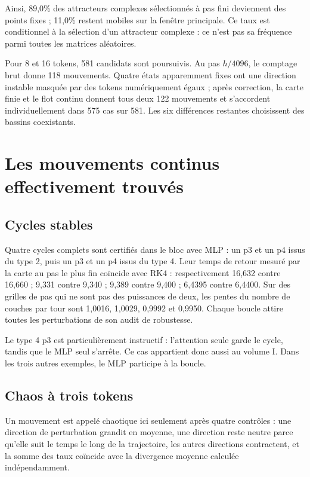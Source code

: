\documentclass[11pt,a4paper]{article}
\theoremstyle{definition}
\begin{document}
Ainsi, 89,0\% des attracteurs complexes sélectionnés à pas fini deviennent des points
fixes ; 11,0\% restent mobiles sur la fenêtre principale. Ce taux est conditionnel à
la sélection d'un attracteur complexe : ce n'est pas sa fréquence parmi toutes les
matrices aléatoires.

Pour 8 et 16 tokens, 581 candidats sont poursuivis. Au pas $h/4096$, le comptage brut
donne 118 mouvements. Quatre états apparemment fixes ont une direction instable masquée
par des tokens numériquement égaux ; après correction, la carte finie et le flot
continu donnent tous deux 122 mouvements et s'accordent individuellement dans
575 cas sur 581. Les six différences restantes choisissent des bassins coexistants.

\section{Les mouvements continus effectivement trouvés}
\label{sec:attractors}

\subsection{Cycles stables}

Quatre cycles complets sont certifiés dans le bloc avec MLP : un p3 et un p4 issus du
type 2, puis un p3 et un p4 issus du type 4. Leur temps de retour mesuré par la carte au
pas le plus fin coïncide avec RK4 : respectivement 16,632 contre 16,660 ; 9,331 contre
9,340 ; 9,389 contre 9,400 ; 6,4395 contre 6,4400. Sur des grilles de pas qui ne sont
pas des puissances de deux, les pentes du nombre de couches par tour sont 1,0016,
1,0029, 0,9992 et 0,9950. Chaque boucle attire toutes les perturbations de son audit de
robustesse.

Le type 4 p3 est particulièrement instructif : l'attention seule garde le cycle, tandis
que le MLP seul s'arrête. Ce cas appartient donc aussi au volume I. Dans les trois
autres exemples, le MLP participe à la boucle.

\subsection{Chaos à trois tokens}

Un mouvement est appelé chaotique ici seulement après quatre contrôles : une direction
de perturbation grandit en moyenne, une direction reste neutre parce qu'elle suit le
temps le long de la trajectoire, les autres directions contractent, et la somme des
taux coïncide avec la divergence moyenne calculée indépendamment.
\end{document}
